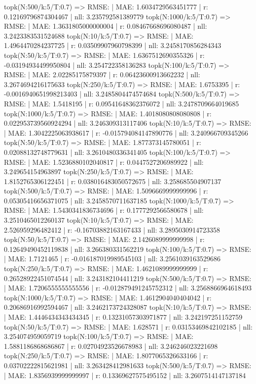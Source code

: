 topk(N:500/k:5/T:0.7) => RMSE: | MAE: 1.6034729563451777 | r: 0.12169796874304467 | nll: 3.235792581389779
topk(N:1000/k:5/T:0.7) => RMSE: | MAE: 1.3631805000000004 | r: 0.08467668696080487 | nll: 3.2423383531524688
topk(N:10/k:5/T:0.7) => RMSE: | MAE: 1.4964470284237725 | r: 0.03509907960798399 | nll: 3.2458170856284343
topk(N:50/k:5/T:0.7) => RMSE: | MAE: 1.6367512690355326 | r: -0.03194934499950804 | nll: 3.254722358136283
topk(N:100/k:5/T:0.7) => RMSE: | MAE: 2.02285175879397 | r: 0.06423600913662232 | nll: 3.2674694216175633
topk(N:250/k:5/T:0.7) => RMSE: | MAE: 1.6753395 | r: -0.0016940651998213403 | nll: 3.2485804474574684
topk(N:500/k:5/T:0.7) => RMSE: | MAE: 1.5418195 | r: 0.09541648362376072 | nll: 3.2478709664019685
topk(N:1000/k:5/T:0.7) => RMSE: | MAE: 1.4018080808080808 | r: 0.022953739560924294 | nll: 3.246309313117406
topk(N:10/k:5/T:0.7) => RMSE: | MAE: 1.3042225063938617 | r: -0.015794084147890776 | nll: 3.240966709345266
topk(N:50/k:5/T:0.7) => RMSE: | MAE: 1.877373145780051 | r: 0.02088132748779631 | nll: 3.2610480336341405
topk(N:100/k:5/T:0.7) => RMSE: | MAE: 1.5236880102040817 | r: 0.0447527206989922 | nll: 3.249654154963897
topk(N:250/k:5/T:0.7) => RMSE: | MAE: 1.8152765306122451 | r: 0.038016483050572675 | nll: 3.258685504907137
topk(N:500/k:5/T:0.7) => RMSE: | MAE: 1.5096669999999996 | r: 0.05305416656371075 | nll: 3.2458570711637185
topk(N:1000/k:5/T:0.7) => RMSE: | MAE: 1.5430341836734696 | r: 0.1777292566580678 | nll: 3.2510465012260137
topk(N:10/k:5/T:0.7) => RMSE: | MAE: 2.526959296482412 | r: -0.16703882163167433 | nll: 3.2895030914723358
topk(N:50/k:5/T:0.7) => RMSE: | MAE: 2.1426089999999998 | r: 0.12649490452119838 | nll: 3.266380331562219
topk(N:100/k:5/T:0.7) => RMSE: | MAE: 1.7121465 | r: -0.016187019989545103 | nll: 3.2561039163529686
topk(N:250/k:5/T:0.7) => RMSE: | MAE: 1.4621089999999999 | r: 0.26528922451074544 | nll: 3.243182104411219
topk(N:500/k:5/T:0.7) => RMSE: | MAE: 1.7206555555555556 | r: -0.012879491245752312 | nll: 3.2568866964618493
topk(N:1000/k:5/T:0.7) => RMSE: | MAE: 1.4612904040404042 | r: 0.20686916992594467 | nll: 3.2462173724328087
topk(N:10/k:5/T:0.7) => RMSE: | MAE: 1.4446434343434345 | r: 0.13231057303971877 | nll: 3.242197251152759
topk(N:50/k:5/T:0.7) => RMSE: | MAE: 1.628571 | r: 0.03153469842102185 | nll: 3.254074959059719
topk(N:100/k:5/T:0.7) => RMSE: | MAE: 1.5881186868686867 | r: 0.02704923526678983 | nll: 3.246246023221698
topk(N:250/k:5/T:0.7) => RMSE: | MAE: 1.8077065326633166 | r: 0.03702222815621981 | nll: 3.263428412981633
topk(N:500/k:5/T:0.7) => RMSE: | MAE: 1.8356939999999997 | r: 0.13369627575495152 | nll: 3.2607514147137184
